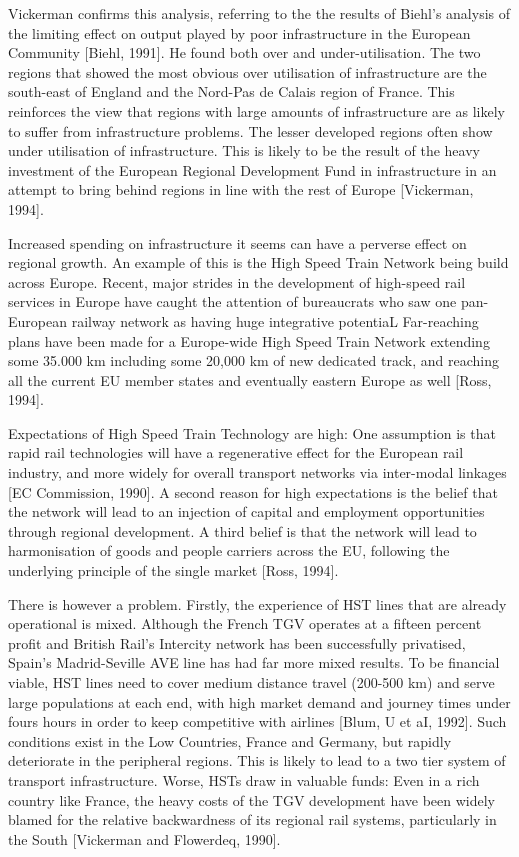 Vickerman confirms this analysis, referring to the the results of Biehl's analysis of the limiting effect on output played by poor infrastructure in the European Community [Biehl, 1991]. He found both over and under-utilisation. The two regions that showed the most obvious over utilisation of infrastructure are the south-east of England and the Nord-Pas de Calais region of France. This reinforces the view that regions with large amounts of infrastructure are as likely to suffer from infrastructure problems. The lesser developed regions often show under utilisation of infrastructure. This is likely to be the result of the heavy investment of the European Regional Development Fund in infrastructure in an attempt to bring behind regions in line with the rest of Europe [Vickerman, 1994].

Increased spending on infrastructure it seems can have a perverse effect on regional growth. An example of this is the High Speed Train Network being build across Europe. Recent, major strides in the development of high-speed rail services in Europe have caught the attention of bureaucrats who saw one pan-European railway network as having huge integrative potentiaL Far-reaching plans have been made for a Europe-wide High Speed Train Network extending some 35.000 km including some 20,000 km of new dedicated track, and reaching all the current EU member states and eventually eastern Europe as well [Ross, 1994].

Expectations of High Speed Train Technology are high: One assumption is that rapid rail technologies will have a regenerative effect for the European rail industry, and more widely for overall transport networks via inter-modal linkages [EC Commission, 1990]. A second reason for high expectations is the belief that the network will lead to an injection of capital and employment opportunities through regional development. A third belief is that the network will lead to harmonisation of goods and people carriers across the EU, following the underlying principle of the single market [Ross, 1994].

There is however a problem. Firstly, the experience of HST lines that are already operational is mixed. Although the French TGV operates at a fifteen percent profit and British Rail's Intercity network has been successfully privatised, Spain's Madrid-Seville AVE line has had far more mixed results. To be financial viable, HST lines need to cover medium distance travel (200-500 km) and serve large populations at each end, with high market demand and journey times under fours hours in order to keep competitive with airlines [Blum, U et aI, 1992]. Such conditions exist in the Low Countries, France and Germany, but rapidly deteriorate in the peripheral regions. This is likely to lead to a two tier system of transport infrastructure. Worse, HSTs draw in valuable funds: Even in a rich country like France, the heavy costs of the TGV development have been widely blamed for the relative backwardness of its regional rail systems, particularly in the South [Vickerman and Flowerdeq, 1990].

